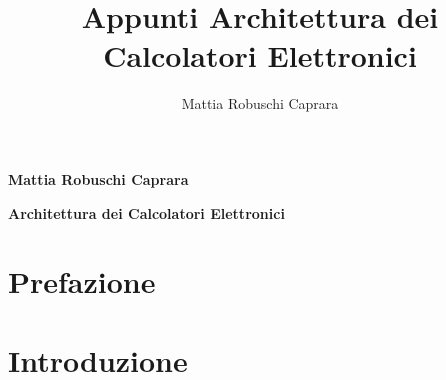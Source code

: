 \documentclass{article}
\title{Appunti Architettura dei Calcolatori Elettronici}
\author{Mattia Robuschi Caprara}
\date{}
\begin{document}
	
	\begin{titlepage}
		
		\pagecolor{CoverGreen}
		
		\vspace{25 mm}
		\begin{center}
			\large
			{\color{black}\textbf{Mattia Robuschi Caprara}} 
		\end{center}
		
		\begin{center}
			\huge
			{\color{black}\textbf{Architettura dei Calcolatori Elettronici}}
		\end{center}
		
		\vspace{45 mm}
		
		\begin{figure}[h]
			\centering
			\label{fig:cover}
		\end{figure}
		
		\thispagestyle{empty} 
	\end{titlepage}
	
	\newpage
	\pagecolor{white}
	\section*{Prefazione}
	\tableofcontents
	\newpage
	
	\section{Introduzione}
\end{document}
